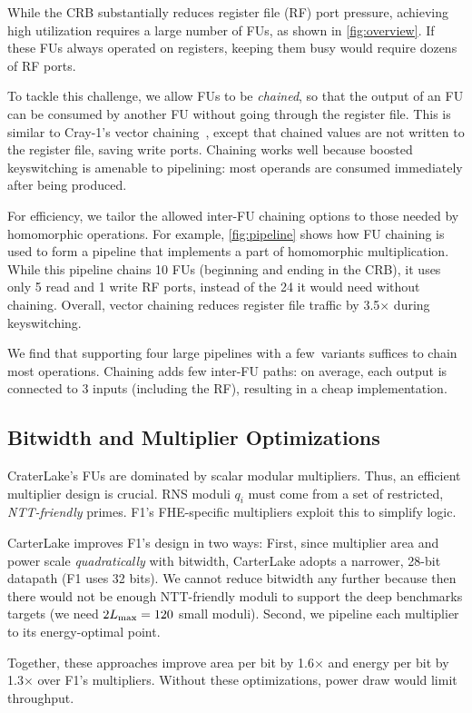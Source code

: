\figPipeline

While the CRB substantially reduces register file (RF) port pressure, achieving
high utilization requires a large number of FUs, as shown in
\autoref{fig:overview}. If these FUs always operated on registers, keeping them
busy would require dozens of RF ports.

To tackle this challenge, we allow FUs to be \emph{chained}, so that the output
of an FU can be consumed by another FU without going through the register file.
This is similar to Cray-1's vector chaining~\cite{russell:cacm78:cray}, except
that chained values are not written to the register file, saving write ports.
Chaining works well because boosted keyswitching is amenable to pipelining:
most operands are consumed immediately after being produced.

For efficiency, we tailor the allowed inter-FU chaining options to those needed
by homomorphic operations. For example, \autoref{fig:pipeline} shows how FU
chaining is used to form a pipeline that implements a part of homomorphic
multiplication. While this pipeline chains 10 FUs (beginning and ending in the
CRB), it uses only 5 read and 1 write RF ports, instead of the 24 it would need
without chaining. Overall, vector chaining reduces register file traffic by
3.5$\times$ during keyswitching.

We find that supporting four large pipelines with a few~variants suffices to
chain most operations. Chaining adds few inter-FU paths: on average, each
output is connected to 3 inputs (including the RF), resulting in a cheap
implementation.

\subsection{Bitwidth and Multiplier Optimizations}\label{sec:bitwidth}

CraterLake's FUs are dominated by scalar modular multipliers. Thus, an
efficient multiplier design is crucial. RNS moduli $q_i$ must come from a set
of restricted, \emph{NTT-friendly} primes. F1's FHE-specific multipliers
exploit this to simplify logic.

CarterLake improves F1's design in two ways: First, since multiplier area and
power scale \emph{quadratically} with bitwidth, CarterLake adopts a narrower,
28-bit datapath (F1 uses 32 bits). We cannot reduce bitwidth any further
because then there would not be enough NTT-friendly moduli to support the deep
benchmarks \name targets (we need $2L_{\textrm{max}} = 120$ small moduli). Second, we
pipeline each multiplier to its energy-optimal point.

Together, these approaches improve area per bit by 1.6$\times$ and energy per
bit by 1.3$\times$ over F1's multipliers. Without these optimizations, power
draw would limit throughput.
